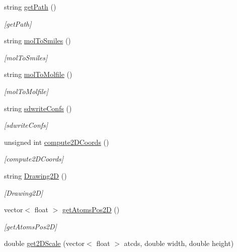 \begin{DoxyCompactItemize}
string \mbox{\hyperlink{class_molecule_a5d97408c9357663ceb2b2bff4471c602}{get\+Path}} ()
\begin{DoxyCompactList}\small\item\em \mbox{[}get\+Path\mbox{]} \end{DoxyCompactList}\item 
string \mbox{\hyperlink{class_molecule_a9575c457c6fb3c38ac260b87434b5a37}{mol\+To\+Smiles}} ()
\begin{DoxyCompactList}\small\item\em \mbox{[}mol\+To\+Smiles\mbox{]} \end{DoxyCompactList}\item 
string \mbox{\hyperlink{class_molecule_af03e0cbd53700d8fda8ed381184a75cc}{mol\+To\+Molfile}} ()
\begin{DoxyCompactList}\small\item\em \mbox{[}mol\+To\+Molfile\mbox{]} \end{DoxyCompactList}\item 
string \mbox{\hyperlink{class_molecule_a4c3f4a82ffe6453c231d78aef0af5efd}{sdwrite\+Confs}} ()
\begin{DoxyCompactList}\small\item\em \mbox{[}sdwrite\+Confs\mbox{]} \end{DoxyCompactList}\item 
unsigned int \mbox{\hyperlink{class_molecule_a0add82d890a92f6b9cab8099becf966f}{compute2\+D\+Coords}} ()
\begin{DoxyCompactList}\small\item\em \mbox{[}compute2\+D\+Coords\mbox{]} \end{DoxyCompactList}\item 
string \mbox{\hyperlink{class_molecule_a7048877e6bd7ac8c34f760ce9e92dc31}{Drawing2D}} ()
\begin{DoxyCompactList}\small\item\em \mbox{[}Drawing2D\mbox{]} \end{DoxyCompactList}\item 
vector$<$ float $>$ \mbox{\hyperlink{class_molecule_aa995ba2f208be94be9d1bbb756cb1e91}{get\+Atoms\+Pos2D}} ()
\begin{DoxyCompactList}\small\item\em \mbox{[}get\+Atoms\+Pos2D\mbox{]} \end{DoxyCompactList}\item 
double \mbox{\hyperlink{class_molecule_ac36056d9d2c1f09d25f70abdd88e7233}{get2\+D\+Scale}} (vector$<$ float $>$ atcds, double width, double height)

\end{DoxyCompactItemize}
